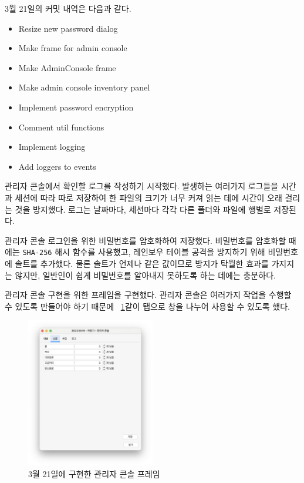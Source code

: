 \documentclass{oblivoir}
\newcommand{\figref}[1]{\figurename~\ref{#1}}
\begin{document}
    3월 21일의 커밋 내역은 다음과 같다.
    \begin{itemize}
        \item Resize new password dialog
        \item Make frame for admin console
        \item Make AdminConsole frame
        \item Make admin console inventory panel
        \item Implement password encryption
        \item Comment util functions
        \item Implement logging
        \item Add loggers to events
    \end{itemize}

    관리자 콘솔에서 확인할 로그를 작성하기 시작했다.
    발생하는 여러가지 로그들을 시간과 세션에 따라 따로 저장하여 한 파일의 크기가 너무 커져 읽는 데에 시간이 오래 걸리는 것을 방지했다.
    로그는 날짜마다, 세션마다 각각 다른 폴더와 파일에 행별로 저장된다.

    관리자 콘솔 로그인을 위한 비밀번호를 암호화하여 저장했다.
    비밀번호를 암호화할 때에는 \texttt{SHA-256} 해시 함수를 사용했고,
    레인보우 테이블 공격을 방지하기 위해 비밀번호에 솔트를 추가했다.
    물론 솔트가 언제나 같은 값이므로 방지가 탁월한 효과를 가지지는 않지만,
    일반인이 쉽게 비밀번호를 알아내지 못하도록 하는 데에는 충분하다.

    관리자 콘솔 구현을 위한 프레임을 구현했다.
    관리자 콘솔은 여러가지 작업을 수행할 수 있도록 만들어야 하기 때문에
    \figref{fig:0321-admin-console}\와 같이 탭으로 창을 나누어 사용할 수 있도록 했다.
    \begin{figure}[h]
        \centering
        \includegraphics[width=0.5\textwidth]{0321-admin-console.png}
        \caption{3월 21일에 구현한 관리자 콘솔 프레임}
        \label{fig:0321-admin-console}
    \end{figure}
\end{document}
